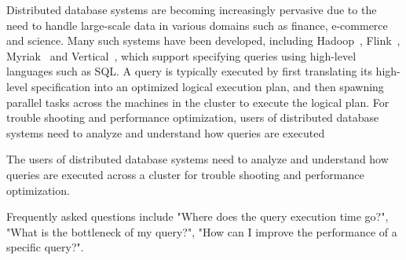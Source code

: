 



Distributed database systems are becoming increasingly pervasive due to the need to handle large-scale data in various domains such as finance, e-commerce and science. Many such systems have been developed, including Hadoop~\cite{hadoop}, Flink~\cite{carbone2015apache}, Myriak~\cite{} and Vertical~\cite{}, which support specifying queries using high-level languages such as SQL. A query is typically executed by first translating its high-level specification into an optimized logical execution plan, and then spawning parallel tasks across the machines in the cluster to execute the logical plan. For trouble shooting and performance optimization, users of distributed database systems need to analyze and understand how queries are executed   

The users of distributed database systems need to analyze and understand how queries are executed across a cluster for trouble shooting and performance optimization.  


Frequently asked questions include "Where does the query execution time go?", "What is the bottleneck of my query?", "How can I improve the performance of a specific query?".    





